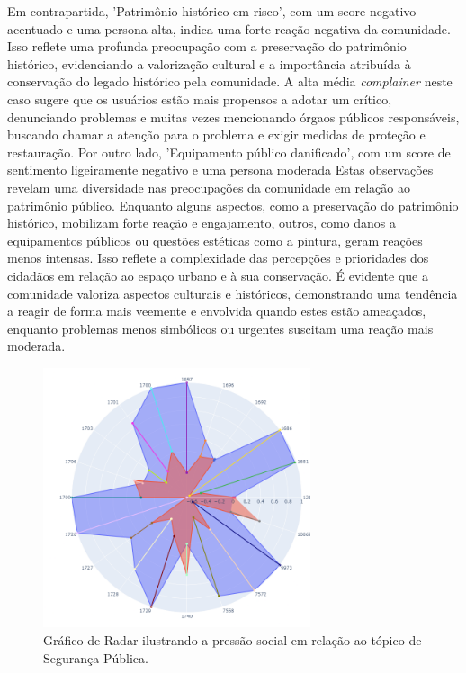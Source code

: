 Em contrapartida, 'Patrimônio histórico em risco', com um score negativo acentuado e uma persona alta, indica uma forte reação negativa da comunidade. Isso reflete uma profunda preocupação com a preservação do patrimônio histórico, evidenciando a valorização cultural e a importância atribuída à conservação do legado histórico pela comunidade. A alta média \textit{complainer} neste caso sugere que os usuários estão mais propensos a adotar um crítico, denunciando problemas e muitas vezes mencionando órgaos públicos responsáveis, buscando chamar a atenção para o problema e exigir medidas de proteção e restauração. Por outro lado, 'Equipamento público danificado', com um score de sentimento ligeiramente negativo e uma persona moderada Estas observações revelam uma diversidade nas preocupações da comunidade em relação ao patrimônio público. Enquanto alguns aspectos, como a preservação do patrimônio histórico, mobilizam forte reação e engajamento, outros, como danos a equipamentos públicos ou questões estéticas como a pintura, geram reações menos intensas. Isso reflete a complexidade das percepções e prioridades dos cidadãos em relação ao espaço urbano e à sua conservação. É evidente que a comunidade valoriza aspectos culturais e históricos, demonstrando uma tendência a reagir de forma mais veemente e envolvida quando estes estão ameaçados, enquanto problemas menos simbólicos ou urgentes suscitam uma reação mais moderada.

\begin{figure}[htb]
	\centering
	\includegraphics[width=0.7\textwidth]{images/social_barometer_security.png}
	\caption{Gráfico de Radar ilustrando a pressão social em relação ao tópico de Segurança Pública.}
	\label{fig:social_barometer_security}
\end{figure}

